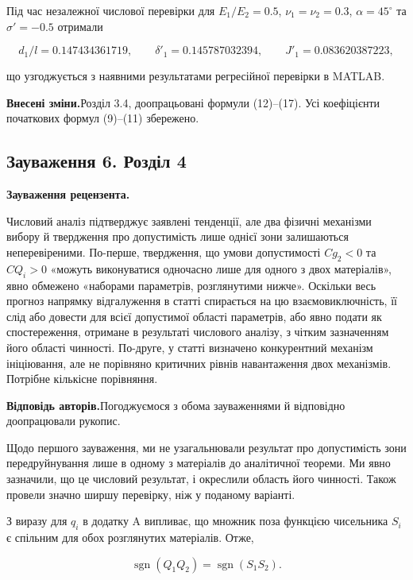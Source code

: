 \documentclass[11pt]{article}
\newcommand{\responseheading}{\textbf{Відповідь авторів.}\enspace}
\newcommand{\revisionheading}{\textbf{Внесені зміни.}\enspace}
\newenvironment{reviewcomment}{\def\FrameCommand{\textcolor{blue!45!black}{\vrule width 1.2pt}\hspace{9pt}}\MakeFramed{\advance\hsize-\width\FrameRestore}\noindent\textbf{Зауваження рецензента.}\par\smallskip\noindent}{\endMakeFramed}
\begin{document}
Під час незалежної числової перевірки для \(E_1/E_2=0.5\), \(\nu_1=\nu_2=0.3\), \(\alpha=45^\circ\) та \(\sigma'=-0.5\) отримали

\[
d_1/l=0.147434361719,\qquad
\delta'_1=0.145787032394,\qquad
J'_1=0.083620387223,
\]

що узгоджується з наявними результатами регресійної перевірки в MATLAB.

\revisionheading Розділ 3.4, доопрацьовані формули (12)–(17). Усі коефіцієнти початкових формул (9)–(11) збережено.

\subsection*{Зауваження 6. Розділ 4}

\begin{reviewcomment}
Числовий аналіз підтверджує заявлені тенденції, але два фізичні механізми вибору й твердження про допустимість лише однієї зони залишаються неперевіреними. По-перше, твердження, що умови допустимості \(Cg_2<0\) та \(CQ_i>0\) «можуть виконуватися одночасно лише для одного з двох матеріалів», явно обмежено «наборами параметрів, розглянутими нижче». Оскільки весь прогноз напрямку відгалуження в статті спирається на цю взаємовиключність, її слід або довести для всієї допустимої області параметрів, або явно подати як спостереження, отримане в результаті числового аналізу, з чітким зазначенням його області чинності. По-друге, у статті визначено конкурентний механізм ініціювання, але не порівняно критичних рівнів навантаження двох механізмів. Потрібне кількісне порівняння.
\end{reviewcomment}

\responseheading Погоджуємося з обома зауваженнями й відповідно доопрацювали рукопис.

Щодо першого зауваження, ми не узагальнювали результат про допустимість зони передруйнування лише в одному з матеріалів до аналітичної теореми. Ми явно зазначили, що це числовий результат, і окреслили область його чинності. Також провели значно ширшу перевірку, ніж у поданому варіанті.

З виразу для \(q_i\) в додатку A випливає, що множник поза функцією чисельника \(S_i\) є спільним для обох розглянутих матеріалів. Отже,

\[
\operatorname{sgn}(Q_1Q_2)
=
\operatorname{sgn}(S_1S_2).
\]
\end{document}
